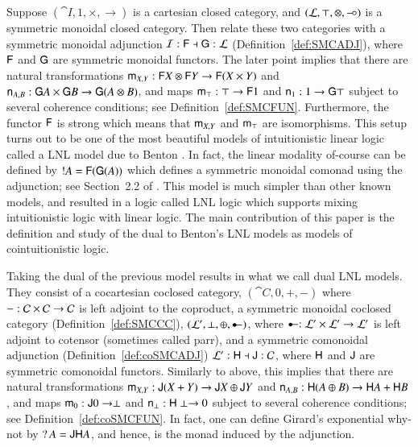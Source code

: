 Suppose $(\cat{I}, 1, \times, \to)$ is a cartesian closed category,
and $(\mathcal{L}, \top, \otimes, \mathrel{-\!\circ})$ is a symmetric monoidal closed
category.  Then relate these two categories with a symmetric monoidal
adjunction $\mathcal{I} : \mathsf{F} \dashv \mathsf{G} : \mathcal{L}$
(Definition~\ref{def:SMCADJ}), where $\mathsf{F}$ and $\mathsf{G}$ are
symmetric monoidal functors.  The later point implies that there are
natural transformations $\mathsf{m}_{X,Y} : \mathsf{F}X \otimes \mathsf{F}Y \rightarrow
\mathsf{F}(X \times Y)$ and $\mathsf{n}_{A,B} : \mathsf{G}A \times \mathsf{G}B \rightarrow
\mathsf{G}(A \otimes B)$, and maps $\mathsf{m}_{\top} : \top \rightarrow \mathsf{F}1$ and
$\mathsf{n}_{1} : 1 \rightarrow \mathsf{G}\top$ subject to several coherence conditions;
see Definition~\ref{def:SMCFUN}.  Furthermore, the functor $\mathsf{F}$
is strong which means that $\mathsf{m}_{X,Y}$ and $\mathsf{m}_{\top}$ are isomorphisms.
This setup turns out to be one of the most beautiful models of
intuitionistic linear logic called a LNL model due to Benton
\cite{Benton:1994}.  In fact, the linear modality of-course can be
defined by $!A = \mathsf{F}(\mathsf{G}(A))$ which defines a symmetric
monoidal comonad using the adjunction; see Section~2.2 of
\cite{Benton:1994}.  This model is much simpler than other known
models, and resulted in a logic called LNL logic which supports mixing
intuitionistic logic with linear logic.  The main contribution of this
paper is the definition and study of the dual to Benton's LNL models
as models of cointuitionistic logic.

Taking the dual of the previous model results in what we call dual LNL
models. They consist of a cocartesian coclosed category, $(\cat{C}, 0,
+, -)$ where $- : \mathcal{C} \times \mathcal{C} \rightarrow \mathcal{C}$ is left adjoint
to the coproduct, a symmetric monoidal coclosed category
(Definition~\ref{def:SMCCC}), $(\cat{L}', \perp, \oplus, \colimp)$,
where $\colimp : \cat{L}' \times \cat{L}' \mto \cat{L}'$ is left
adjoint to cotensor (sometimes called parr), and a symmetric
comonoidal adjunction (Definition~\ref{def:coSMCADJ}) $\mathcal{L'} :
\mathsf{H} \dashv \mathsf{J} : \mathcal{C}$, where $\mathsf{H}$ and $\mathsf{J}$
are symmetric comonoidal functors.  Similarly to above, this implies
that there are natural transformations $\mathsf{m}_{X,Y} : \mathsf{J}(X + Y) \rightarrow
\mathsf{J}X \oplus \mathsf{J}Y$ and $\mathsf{n}_{A,B} : \mathsf{H}(A \oplus B) \rightarrow
\mathsf{H}A + \mathsf{H}B$, and maps $\mathsf{m}_{0} : \mathsf{J}0 \rightarrow \perp$ and
$\mathsf{n}_{\perp} : \mathsf{H}\perp \rightarrow 0$ subject to several coherence conditions;
see Definition~\ref{def:coSMCFUN}.  In fact, one can define Girard's
exponential why-not by $\mathop{?} A = \mathsf{JH}A$, and hence, is the monad
induced by the adjunction.


